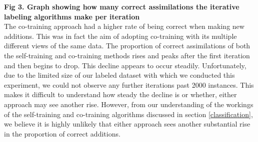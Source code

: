\documentclass[10pt,letterpaper]{article}
\begin{document}
\textbf{Fig 3. Graph showing how many correct assimilations the iterative labeling algorithms make per iteration}\\

The co-training approach had a higher rate of being correct when making new additions. This was in fact the aim of adopting co-training with its multiple different views of the same data. The proportion of correct assimilations of both the self-training and co-training methods rises and peaks after the first iteration and then begins to drop. This decline appears to occur steadily. Unfortunately, due to the limited size of our labeled dataset with which we conducted this experiment, we could not observe any further iterations past 2000 instances. This makes it difficult to understand how steady the decline is or whether, either approach may see another rise. However, from our understanding of the workings of the self-training and co-training algorithms discussed in section \ref{classification}, we believe it is highly unlikely that either approach sees another substantial rise in the proportion of correct additions. \\ 
%
\end{document}
